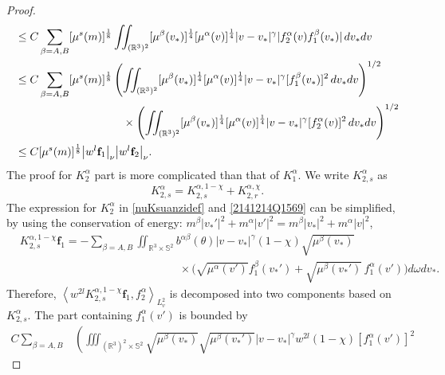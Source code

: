 \documentclass[reqno]{amsart}
\numberwithin{equation}{section}
\numberwithin{equation}{section}
\begin{document}
\begin{proof}
\begin{align}
			&\leq C \sum_{\beta=A,B}[\mu^s(m)]^{\frac{1}{8}} \iint_{(\mathbb{R}^3)^2} [\mu^\beta(v_*)]^{\frac{1}{4}}[\mu^\alpha(v)]^{\frac{1}{4}}|v - v_*|^\gamma |f^{\alpha}_2(v)f^\beta_1(v_*)| \, dv_* dv \notag\\
			&\leq C \sum_{\beta=A,B}[\mu^s(m)]^{\frac{1}{8}} \left( \iint_{(\mathbb{R}^3)^2} [\mu^\beta(v_*)]^{\frac{1}{4}}[\mu^\alpha(v)]^{\frac{1}{4}}|v - v_*|^\gamma [f^\beta_1(v_*)]^2 \, dv_* dv \right)^{1/2} \notag\\
			&\hspace{3.4cm} \times \left( \iint_{(\mathbb{R}^3)^2} [\mu^\beta(v_*)]^{\frac{1}{4}}[\mu^\alpha(v)]^{\frac{1}{4}}|v - v_*|^\gamma [f^\alpha_2(v)]^2 \, dv_* dv \right)^{1/2} \notag\\
			&\leq C [\mu^s(m)]^{\frac{1}{8}}  \big| w^l \mathbf{f}_1 \big|_\nu \big| w^l \mathbf{f}_2 \big|_\nu. \label{k1sregu}
		\end{align}
		The proof for $K^{\alpha}_2$ part is more complicated than that of $K^{\alpha}_1$. 
		We write $K_{2,s}^{\alpha}$ as
		\begin{equation*}
			K_{2,s}^{\alpha}=K^{\alpha,1-\chi}_{2,s}+K_{2,r}^{\alpha,\chi}.
		\end{equation*}
		 The expression for $K^{\alpha}_2$ in \eqref{nuKsuanzidef} and \eqref{2141214Q1569} can be simplified, by using the conservation of energy:  $m^{\beta}|v_*'|^{2}+m^{\alpha}|v'|^2 =m^{\beta}|v_*|^2+m^{\alpha}|v|^2$,
		\begin{equation*}
			\begin{split}
				&	 K_{2,s}^{\alpha,1-\chi} \mathbf{f}_1= -  \sum_{\beta=A,B} \iint_{\mathbb{R}^3 \times \mathbb{S}^2}
				b^{ \alpha \beta}(\theta)|v-v_*|^{\gamma}(1 - \chi) \sqrt{\mu^\beta(v_*)}\\  &\hspace{6cm}\times\Big(\sqrt{\mu^\alpha(v')}f^\beta_1(v_*')
				 +\sqrt{\mu^{\beta}(v_*')} \, f^\alpha_1(v')\Big) d\omega dv_*.
			\end{split}	
		\end{equation*}	
		‌Therefore, $\left \langle  w^{2l}K_{2,s}^{\alpha,1-\chi}\mathbf{f}_1,f^{\alpha}_2\right \rangle_{L^{2}_{v}} $  is decomposed into two components based on $K_{2,s}^{\alpha}$. The part containing $f^\alpha_1(v')$ is bounded by
		\begin{equation}\label{lem22k2ssig}
			\begin{split}
				C\sum_{\beta=A,B} &\left(\iiint_{(\mathbb{R}^3)^2 \times \mathbb{S}^2}
				\sqrt{\mu^\beta(v_*)}\sqrt{\mu^{\beta}(v_*')}|v - v_*|^\gamma w^{2l} (1 - \chi)[f^\alpha_1(v')]^2

\end{split}
\end{equation}
\end{proof}
\end{document}
